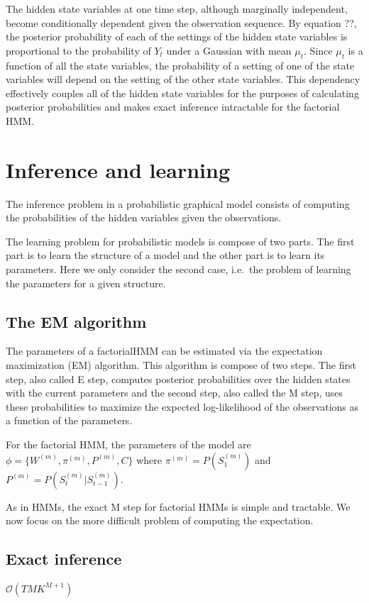 \documentclass{article}
\begin{document}
The hidden state variables at one time step, although marginally independent, become conditionally dependent given the observation sequence. By equation ??, the posterior probability of each of the settings of the hidden state variables is proportional to the probability of $Y_t$ under a Gaussian with mean $\mu_t$. Since $\mu_t$ is a function of all the state variables, the probability of a setting of one of the state variables will depend on the setting of the other state variables. This dependency effectively couples all of the hidden state variables for the purposes of calculating posterior probabilities and makes exact inference intractable for the factorial HMM.

\section{Inference and learning}

The inference problem in a probabilistic graphical model consists of computing the probabilities of the hidden variables given the observations.

The learning problem for probabilistic models is compose of two parts. The first part is to learn the structure of a model and the other part is to learn its parameters. Here we only consider the second case, i.e.\ the problem of learning the parameters for a given structure. 

\subsection{The EM algorithm}

The parameters of a factorialHMM can be estimated via the expectation maximization (EM) algorithm. This algorithm is compose of two steps. The first step, also called E step, computes posterior probabilities over the hidden states with the current parameters and the second step, also called the M step, uses these probabilities to maximize the expected log-likelihood of the observations as a function of the parameters.

For the factorial HMM, the parameters of the model are $\phi = \{ W^{(m)}, \pi^{(m)}, P^{(m)}, C \}$ where $\pi^{(m)} = P(S_1^{(m)})$ and $P^{(m)} = P(S_t^{(m)} | S_{t-1}^{(m)})$. 

As in HMMs, the exact M step for factorial HMMs is simple and tractable. We now focus on the more difficult problem of computing the expectation.

\subsection{Exact inference}
$\mathcal{O}(T M K^{M+1})$
\end{document}
